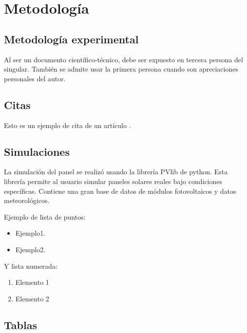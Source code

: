 \chapter{Metodología}

\section{Metodología experimental}

Al ser un documento científico-técnico, debe ser expuesto en tercera persona del singular. También se admite usar la primera persona cuando son apreciaciones personales del autor.

\section{Citas}


Esto es un ejemplo de cita de un artículo \cite{Brunete:2013}.


\section{Simulaciones}


La simulación del panel se realizó usando la librería PVlib de python. Esta librería permite al usuario simular paneles solares reales bajo condiciones específicas. Contiene una gran base de datos de módulos fotovoltaicos y datos meteorológicos.



Ejemplo de lista de puntos:
\begin{itemize}
\item Ejemplo1.
\item Ejemplo2.
\end{itemize} 

Y lista numerada:
\begin{enumerate}
\item Elemento 1
\item Elemento 2
\end{enumerate}

\section{Tablas}

